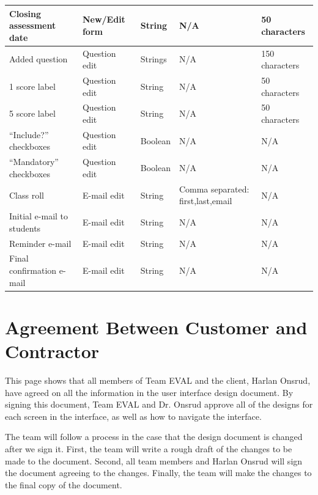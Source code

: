 \documentclass{article}
\begin{document}
\begin{center}
{\begin{tabular}{|p{4.4cm}|p{2.2cm}|p{1.5cm}|p{4cm}|p{3cm}|}
Closing assessment date & New/Edit form & String & N/A & 50 characters\\ 
\hline
Added question & Question edit & Strings & N/A & 150 characters\\ 
\hline
1 score label & Question edit & String & N/A & 50 characters\\
\hline
5 score label & Question edit & String & N/A & 50 characters\\
\hline
``Include?'' checkboxes & Question edit & Boolean & N/A & N/A \\ 
\hline
``Mandatory'' checkboxes & Question edit & Boolean & N/A & N/A \\ 
\hline
Class roll & E-mail edit & String & Comma separated: \newline first,last,email & N/A \\ 
\hline
Initial e-mail to students & E-mail edit & String & N/A & N/A \\ 
\hline
Reminder e-mail & E-mail edit & String & N/A & N/A\\ 
\hline
Final confirmation e-mail & E-mail edit & String & N/A & N/A\\ 
\hline
\end{tabular}
}
\end{center}

\appendix
{}

\newpage
\section{Agreement Between Customer and Contractor}
This page shows that all members of Team EVAL and the client, Harlan Onsrud, have agreed on all the information in the user interface design document. By signing this document, Team EVAL and Dr. Onsrud approve all of the designs for each screen in the interface, as well as how to navigate the interface.

The team will follow a process in the case that the design document is changed after we sign it. First, the team will write a rough draft of the changes to be made to the document. Second, all team members and Harlan Onsrud will sign the document agreeing to the changes. Finally, the team will make the changes to the final copy of the document.
\end{document}
